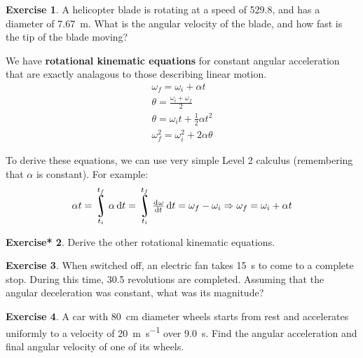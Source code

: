 \documentclass[a4paper]{amsbook}
\theoremstyle{definition}
\newtheorem{exercise}{Exercise}
\numberwithin{exercise}{chapter}
\newtheorem{exercise*}[exercise]{Exercise*}
\numberwithin{exercise}{chapter}
\DeclareMathOperator*{\rint}{\scalerel*{\rotatebox{17}{$\!\int\!$}}{\int}}
\begin{document}
\begin{exercise}
  A helicopter blade is rotating at a speed of \SI{529.8}{\rpm}, and has a diameter of \SI{7.67}{\metre}. What is the angular
  velocity of the blade, and how fast is the tip of the blade moving?
\end{exercise}

We have \textbf{rotational kinematic equations} for constant angular acceleration that are exactly analagous to those describing linear motion.
\begin{gather}
  \omega_f = \omega_i + \alpha t\\
  \theta = \frac{\omega_i + \omega_f}{2}\\
  \theta = \omega_i t + \frac{1}{2} \alpha t^2\\
  \omega_f^2 = \omega_i^2 + 2 \alpha \theta
\end{gather}

To derive these equations, we can use very simple Level 2 calculus (remembering that $ \alpha $ is constant). For example:
\begin{gather*}
  \alpha t = \rint_{t_i}^{t_f} \alpha \dif{t} = \rint_{t_i}^{t_f} \od{\omega}{t} \dif{t} = \omega_f - \omega_i \Rightarrow \omega_f = \omega_i + \alpha t\\
\end{gather*}

\begin{exercise*}
  Derive the other rotational kinematic equations.
\end{exercise*}

\begin{exercise}
  When switched off, an electric fan takes \SI{15}{\second} to come to a complete stop. During this time,
  30.5 revolutions are completed. Assuming that the angular deceleration was constant, what was its magnitude?
\end{exercise}

\begin{exercise}
  A car with \SI{80}{\centi\metre} diameter wheels starts from rest and accelerates uniformly to a velocity of \SI{20}{\metre\per\second}
  over \SI{9.0}{\second}. Find the angular acceleration and final angular velocity of one of its wheels.
\end{exercise}
\end{document}
